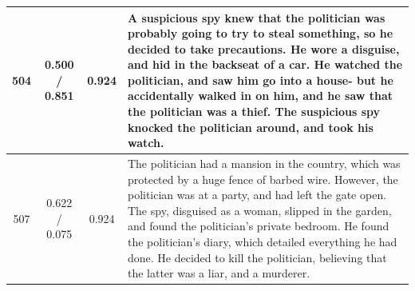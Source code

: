\begin{table}[ht]
\begin{center}
\begin{tabular}{cccp{8.5cm}}
    \midrule
    504 & 0.500 / 0.851 & 0.924 & A suspicious spy knew that the politician was probably going to try to steal something, so he decided to take precautions. He wore a disguise, and hid in the backseat of a car. He watched the politician, and saw him go into a house- but he accidentally walked in on him, and he saw that the politician was a thief. The suspicious spy knocked the politician around, and took his watch. \\
    \midrule
    507 & 0.622 / 0.075 & 0.924 & The politician had a mansion in the country, which was protected by a huge fence of barbed wire. However, the politician was at a party, and had left the gate open. The spy, disguised as a woman, slipped in the garden, and found the politician's private bedroom. He found the politician's diary, which detailed everything he had done. He decided to kill the politician, believing that the latter was a liar, and a murderer. \\
    \bottomrule
  \end{tabular}
  \end{center}
  \label{app:iter_stories_b4}
\end{table}
